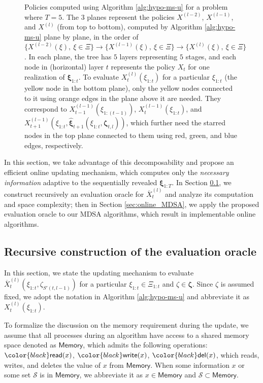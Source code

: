 \documentclass[11pt,fullpage,letterpaper]{article}
\newcommand{\mc}{\mathcal}
\newcommand{\bx}{\boldsymbol{\xi}}
\newcommand{\bz}{\boldsymbol{\zeta}}
\newcommand{\memo}{\mathsf{Memory}}
\newcommand{\rr}[1]{{\color{black}\mathsf{read}(#1)}}
\newcommand{\ww}[1]{{\color{black}\mathsf{write}(#1)}}
\newcommand{\del}[1]{{\color{black}\mathsf{del}(#1)}}
\begin{document}
\begin{figure}
{\begin{tikzpicture}
\end{tikzpicture}}
    \caption{Policies computed using Algorithm \ref{alg:hypo-ms-u} for a problem where $T=5$. The $3$ planes represent the policies $X^{(l-2)}$, $X^{(l-1)}$, and $X^{(l)}$ (from top to bottom), computed by Algorithm \ref{alg:hypo-ms-u} plane by plane, in the order of $\{X^{(l-2)}(\xi),~\xi\in \Xi\}\to \{X^{(l-1)}(\xi),~\xi\in \Xi\}\to \{X^{(l)}(\xi),~\xi\in \Xi\}$. In each plane, the tree has $5$ layers representing $5$ stages, and each node in (horizontal) layer $t$ represents the policy $X_t$ for one realization of $\bx_{1:t}$. To evaluate $X_t^{(l)}(\xi_{1:t})$ for a particular $\xi_{1:t}$ (the yellow node in the bottom plane), only the yellow nodes connected to it using orange edges in the plane above it are needed. They correspond to $X_{t-1}^{(l-1)}(\xi_{1:(t-1)})$, $X_t^{(l-1)}(\xi_{1:t})$, and $X_{t+1}^{(l-1)}(\xi_{1:t},\widehat{\bx}_{t+1}(\xi_{1:t},\bz_{t,l}))$, which further need the starred nodes in the top plane connected to them using red, green, and blue edges, respectively.}
    \label{fig:tree-visited-3d}
\end{figure}


In this section, we take advantage of this decomposability and propose an efficient online updating mechanism, which computes only the \textit{necessary information} adaptive to the sequentially revealed $\bx_{1:T}$. In Section \ref{sec:eval_oracle}, we construct recursively an evaluation oracle for $\overline{X}_t^{(l)}$ and analyze its computation and space complexity; then in Section \ref{sec:online_MDSA}, we apply the proposed evaluation oracle to our MDSA algorithms, which result in implementable online algorithms. 

\subsection{Recursive construction of the evaluation oracle}\label{sec:eval_oracle}

In this section, we state the updating mechanism to evaluate $\overline{X}_t^{(l)}(\xi_{1:t},\zeta_{S'(t,l-1)})$ for a particular $\xi_{1:t}\in \Xi_{1:t}$ and $\zeta\in \bz$. Since $\zeta$ is assumed fixed, we adopt the notation in Algorithm \ref{alg:hypo-ms-u} and abbreviate it as $X_t^{(l)}(\xi_{1:t})$. 

To formalize the discussion on the memory requirement during the update, we assume that all processes during an algorithm have access to a shared memory space denoted as $\memo$, which admits the following operations: $\rr{x}$, $\ww{x}$, $\del{x}$, which reads, writes, and deletes the value of $x$ from $\memo$. When some information $x$ or some set $\mc S$ is in $\memo$, we abbreviate it as $x\in \memo$ and $\mc S\subset \memo$.  
\end{document}
